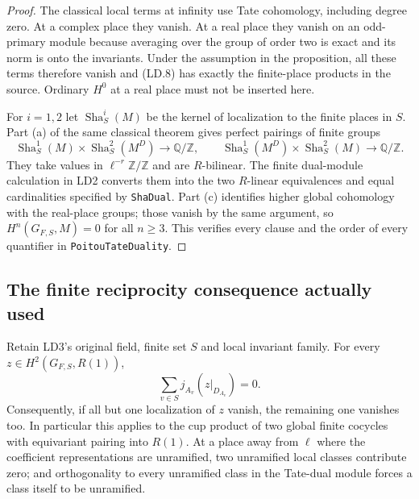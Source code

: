 \begin{proof}
The classical local terms at infinity use Tate cohomology, including
degree zero.  At a complex place they vanish.  At a real place they
vanish on an odd-primary module because averaging over the group of
order two is exact and its norm is onto the invariants.  Under the
assumption in the proposition, all these terms therefore vanish
and (LD.8) has exactly the finite-place products in the source.
Ordinary $H^0$ at a real place must not be inserted here.

For $i=1,2$ let $\operatorname{Sha}^i_S(M)$ be the kernel of localization to the
finite places in $S$.  Part (a) of the same classical theorem gives
perfect pairings of finite groups
\[
 \operatorname{Sha}^1_S(M)\times\operatorname{Sha}^2_S(M^D)\longrightarrow\mathbb Q/\mathbb Z,
 \qquad
 \operatorname{Sha}^1_S(M^D)\times\operatorname{Sha}^2_S(M)\longrightarrow\mathbb Q/\mathbb Z.
 \tag{LD.9}
\]
They take values in $\ell^{-r}\mathbb Z/\mathbb Z$ and are
$R$-bilinear.  The finite dual-module calculation in LD2 converts
them into the two $R$-linear equivalences and equal cardinalities
specified by \texttt{ShaDual}.  Part (c) identifies higher global
cohomology with the real-place groups; those vanish by the same
argument, so $H^n(G_{F,S},M)=0$ for all $n\ge3$.
This verifies every clause and the order of every quantifier in
\texttt{PoitouTateDuality}.
\end{proof}

\subsection{The finite reciprocity consequence actually used}

\begin{proposition}
\label{prop:ld-reciprocity}
Retain LD3's original field, finite set $S$ and local invariant
family.  For every $z\in H^2(G_{F,S},R(1))$,
\[
                    \sum_{v\in S}j_{A_v}(z|_{D_{A_v}})=0.
                    \tag{LD.10}
\]
Consequently, if all but one localization of $z$ vanish, the remaining
one vanishes too.  In particular this applies to the cup product of
two global finite cocycles with equivariant pairing into $R(1)$.
At a place away from $\ell$ where the coefficient representations
are unramified, two unramified local classes contribute zero; and
orthogonality to every unramified class in the Tate-dual module
forces a class itself to be unramified.
\end{proposition}

